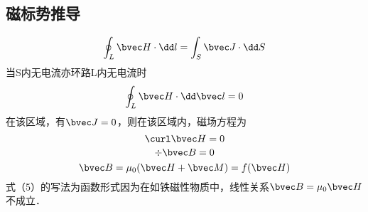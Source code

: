 
\subsection{磁标势推导}
\begin{equation}
\oint_L \bvec H \cdot \dd  l = \int_S \bvec J \cdot \dd S

\end{equation}当S内无电流亦环路L内无电流时
\begin{equation}
\oint_ L\bvec H \cdot \dd \bvec l = 0
\end{equation}
在该区域，有$\bvec J=0$，则在该区域内，磁场方程为 
\begin{equation}
\curl \bvec H =0
\end{equation}
\begin{equation}
\div \bvec B=0
\end{equation}
\begin{equation}
\bvec B=\mu_0(\bvec H+\bvec M)=f(\bvec H)
\end{equation}
式（5）的写法为函数形式因为在如铁磁性物质中，线性关系$\bvec B=\mu_0 \bvec H$不成立．


